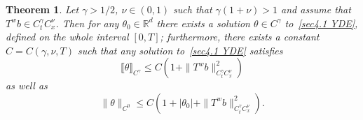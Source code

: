 \documentclass[10pt]{article}
\newcommand{\comma}{{,}}
\newtheorem{theorem}{Theorem}
\begin{document}
\begin{theorem}
  \label{sec4.1 thm existence YDE}Let $\gamma > 1 / 2$, $\nu \in (0, 1)$ such
  that $\gamma (1 + \nu) > 1$ and assume that $T^w b \in C^{\gamma}_t
  C^{\nu}_x$. Then for any $\theta_0 \in \mathbb{R}^d$ there exists a solution
  $\theta \in C^{\gamma}$ to~{\eqref{sec4.1 YDE}}, defined on the whole
  interval $[0, T]$; furthermore, there exists a constant $C = C (\gamma
  \comma \nu, T)$ such that any solution to~{\eqref{sec4.1 YDE}} satisfies
  \begin{equation}
    \llbracket \theta \rrbracket_{C^{\gamma}} \leqslant C (1 + \| T^w b
    \|_{C^{\gamma}_t C_x^{\nu}}^2) \label{sec4.1 thm existence a priori
    estimate 1}
  \end{equation}
  as well as
  \begin{equation}
    \| \theta \|_{C^0} \leqslant C (1 + | \theta_0 | + \| T^w b
    \|_{C^{\gamma}_t C_x^{\nu}}^2) . \label{sec4.1 thm existence a priori
    estimate 2}
  \end{equation}
\end{theorem}
\end{document}
